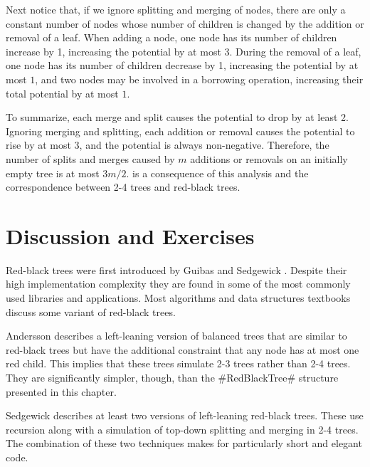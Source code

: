 Next notice that, if we ignore splitting and merging of nodes, there
are only a constant number of nodes whose number of children is changed
by the addition or removal of a leaf.  When adding a node, one node
has its number of children increase by 1, increasing the potential by
at most $3$.  During the removal of a leaf, one node has its number of
children decrease by 1, increasing the potential by at most $1$, and two
nodes may be involved in a borrowing operation, increasing their total
potential by at most $1$.

To summarize, each merge and split causes the potential to drop by
at least 2.  Ignoring merging and splitting, each addition or removal
causes the potential to rise by at most 3, and the potential is always
non-negative.  Therefore, the number of splits and merges caused by $m$
additions or removals on an initially empty tree is at most $3m/2$.
 is a consequence of this analysis and the
correspondence between 2-4 trees and red-black trees.

\section{Discussion and Exercises}

Red-black trees were first introduced by Guibas and Sedgewick \cite{gs78}.
Despite their high implementation complexity they are found in some of
the most commonly used libraries and applications.  Most algorithms and
data structures textbooks discuss some variant of red-black trees.

Andersson \cite{a93} describes a left-leaning version of balanced trees
that are similar to red-black trees but have the additional constraint
that any node has at most one red child.  This implies that these trees
simulate 2-3 trees rather than 2-4 trees.  They are significantly simpler,
though, than the #RedBlackTree# structure presented in this chapter.

Sedgewick \cite{s08} describes at least two versions of left-leaning
red-black trees.  These use recursion along with a simulation of
top-down splitting and merging in 2-4 trees. The combination of these
two techniques makes for particularly short and elegant code.

